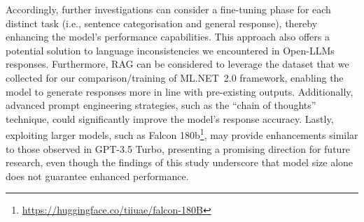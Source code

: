 Accordingly, further investigations can consider a fine-tuning phase for each distinct task (i.e., sentence categorisation and general response), thereby enhancing the model's performance capabilities. 
%
This approach also offers a potential solution to language inconsistencies we encountered in Open-LLMs responses.
%
Furthermore, RAG can be considered to leverage the dataset that we collected for our comparison/training of ML.NET~2.0 framework, enabling the model to generate responses more in line with pre-existing outputs. Additionally, advanced prompt engineering strategies, such as the ``chain of thoughts''~\cite{wei2022chain} technique, could significantly improve the model's response accuracy. 
%
Lastly, exploiting larger models, such as Falcon 180b\footnote{\url{https://huggingface.co/tiiuae/falcon-180B}}, may provide enhancements similar to those observed in GPT-3.5 Turbo, presenting a promising direction for future research, even though the findings of this study underscore that model size alone does not guarantee enhanced performance.





 




